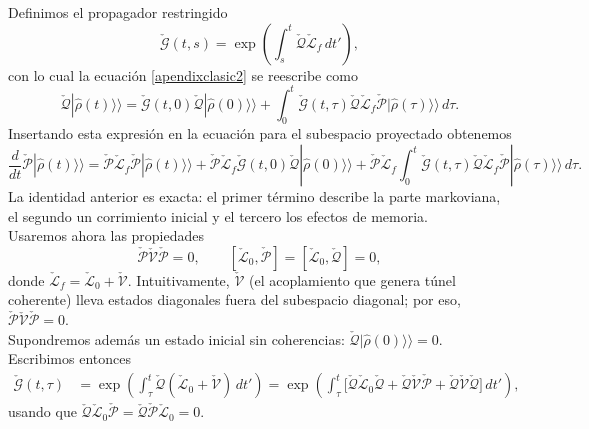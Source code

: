 \begin{appendixs}
Definimos el propagador restringido
\begin{equation*}
    \check{\mathcal{G}}(t,s)=\exp\!\left(\int_{s}^{t}\check{\mathcal{Q}}\check{\mathcal{L}}_{f}\,dt'\right),
\end{equation*}
con lo cual la ecuación \eqref{apendixclasic2} se reescribe como
\begin{equation*}
    \check{\mathcal{Q}}|\hat{\rho}(t)\rangle\rangle
    =\check{\mathcal{G}}(t,0)\check{\mathcal{Q}}|\hat{\rho}(0)\rangle\rangle
     +\int_{0}^{t}\check{\mathcal{G}}(t,\tau)\check{\mathcal{Q}}\check{\mathcal{L}}_{f}\check{\mathcal{P}}
        |\hat{\rho}(\tau)\rangle\rangle\,d\tau .
\end{equation*}
Insertando esta expresión en la ecuación para el subespacio proyectado obtenemos
\begin{equation}
    \frac{d}{dt}\check{\mathcal{P}}|\hat{\rho}(t)\rangle\rangle
    =\check{\mathcal{P}}\check{\mathcal{L}}_{f}\check{\mathcal{P}}|\hat{\rho}(t)\rangle\rangle
     +\check{\mathcal{P}}\check{\mathcal{L}}_{f}\check{\mathcal{G}}(t,0)\check{\mathcal{Q}}|\hat{\rho}(0)\rangle\rangle
     +\check{\mathcal{P}}\check{\mathcal{L}}_{f}\!\int_{0}^{t}\!\check{\mathcal{G}}(t,\tau)\check{\mathcal{Q}}\check{\mathcal{L}}_{f}\check{\mathcal{P}}
       |\hat{\rho}(\tau)\rangle\rangle\,d\tau .
    \label{apendix5exactp}
\end{equation}
La identidad anterior es exacta: el primer término describe la parte markoviana, el segundo un
corrimiento inicial y el tercero los efectos de memoria.
\\

Usaremos ahora las propiedades
\begin{equation*}
    \check{\mathcal{P}}\check{\mathcal{V}}\check{\mathcal{P}}=0,
    \qquad
    [\check{\mathcal{L}}_{0},\check{\mathcal{P}}]=[\check{\mathcal{L}}_{0},\check{\mathcal{Q}}]=0,
\end{equation*}
donde $\check{\mathcal{L}}_{f}=\check{\mathcal{L}}_{0}+\check{\mathcal{V}}$. Intuitivamente,
$\check{\mathcal{V}}$ (el acoplamiento que genera túnel coherente) lleva estados diagonales fuera
del subespacio diagonal; por eso, $\check{\mathcal{P}}\check{\mathcal{V}}\check{\mathcal{P}}=0$.
\\

Supondremos además un estado inicial sin coherencias:
$\check{\mathcal{Q}}|\hat{\rho}(0)\rangle\rangle=0$.
Escribimos entonces
\begin{align*}
    \check{\mathcal{G}}(t,\tau)
    &=\exp\!\left(\int_{\tau}^{t}\check{\mathcal{Q}}(\check{\mathcal{L}}_{0}+\check{\mathcal{V}})\,dt'\right)
      =\exp\!\left(\int_{\tau}^{t}\big[\check{\mathcal{Q}}\check{\mathcal{L}}_{0}\check{\mathcal{Q}}
      +\check{\mathcal{Q}}\check{\mathcal{V}}\check{\mathcal{P}}
      +\check{\mathcal{Q}}\check{\mathcal{V}}\check{\mathcal{Q}}\big]\,dt'\right),
\end{align*}
usando que $\check{\mathcal{Q}}\check{\mathcal{L}}_{0}\check{\mathcal{P}}=\check{\mathcal{Q}}\check{\mathcal{P}}\check{\mathcal{L}}_{0}=0$.
\\


\end{appendixs}
